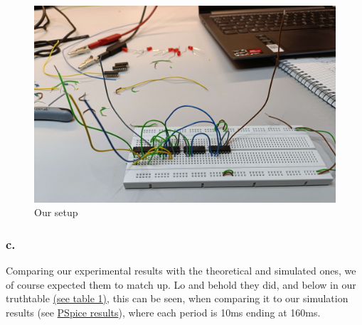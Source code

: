 \documentclass{article}
\begin{document}

\begin{figure}[h] 
  \centering
  \caption{Our setup}\label{fig:setup}\hypertarget{setup}{\space}
  \includegraphics[width=0.8\linewidth, keepaspectratio=true]{exercise3setup}
\end{figure}

\subsubsection*{c.} 
Comparing our experimental results with the theoretical and simulated ones, we of course expected them to match up. 
Lo and behold they did, and below in our truthtable \hyperlink{Y4Table}{(see table 1)}, this can be seen, when comparing
it to our simulation results (see \hyperlink{PSpice}{PSpice results}), where each period is 10ms ending at 160ms. 
\end{document}

